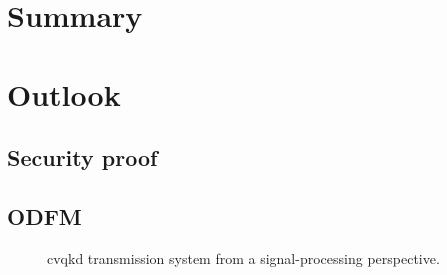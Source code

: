 \section{Summary}

\section{Outlook}

\subsection{Security proof}

\subsection{ODFM}

\begin{figure}[htb]
	\centering
	
	\caption{\Gls{cvqkd} transmission system from a signal-processing perspective.}
\end{figure}
